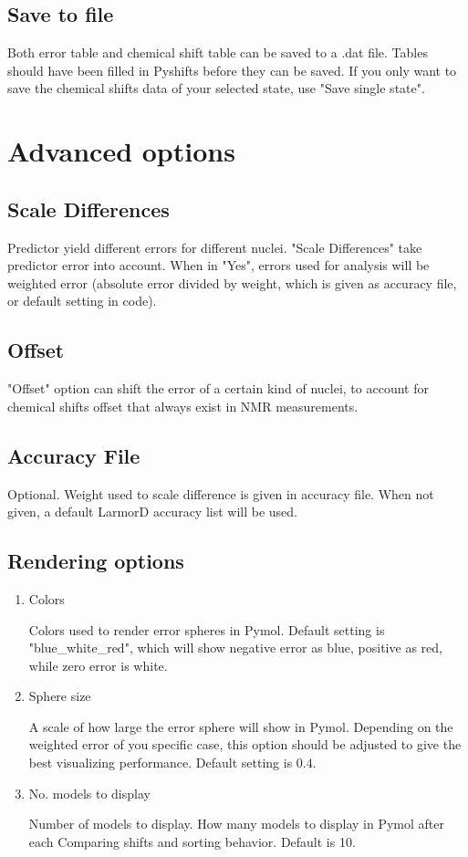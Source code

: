 \documentclass{article}
\begin{document}
\subsection{Save to file}
Both error table and chemical shift table can be saved to a .dat file. Tables should have been filled in Pyshifts before they can be saved. If you only want to save the chemical shifts data of your selected state, use "Save single state".


\newpage
\section{Advanced options}
\subsection{Scale Differences}
Predictor yield different errors for different nuclei. "Scale Differences" take predictor error into account. When in "Yes", errors used for analysis will be weighted error (absolute error divided by weight, which is given as accuracy file, or default setting in code).
\subsection{Offset}
"Offset" option can shift the error of a certain kind of nuclei, to account for chemical shifts offset that always exist in NMR measurements.
\subsection{Accuracy File}
Optional. Weight used to scale difference is given in accuracy file. When not given, a default LarmorD accuracy list will be used. 
\subsection{Rendering options}
\begin{enumerate}
\item{Colors}

Colors used to render error spheres in Pymol. Default setting is "blue\_white\_red", which will show negative error as blue, positive as red, while zero error is white.
\item{Sphere size}

A scale of how large the error sphere will show in Pymol. Depending on the weighted error of you specific case, this option should be adjusted to give the best visualizing performance. Default setting is $0.4$.
\item{No. models to display}

Number of models to display. How many models to display in Pymol after each Comparing shifts and sorting behavior. Default is 10.
\end{enumerate}
\end{document}
